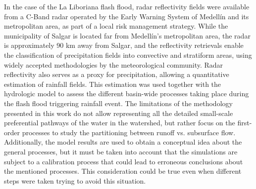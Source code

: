 \documentclass[hess, manuscript]{copernicus}
\begin{document}
In the case of the La Liboriana flash flood, radar reflectivity fields were available from a C-Band radar operated by the Early Warning System of Medellín and its metropolitan area, as part of a local risk management strategy. While the municipality of Salgar is located far from Medellín's metropolitan area, the radar is approximately 90 km away from Salgar, and the reflectivity retrievals enable the classification of precipitation fields into convective and stratiform areas, using widely accepted methodologies by the meteorological community.  Radar reflectivity also serves as a proxy for precipitation, allowing a quantitative estimation of rainfall fields. This estimation was used together with the hydrologic model to assess the different basin-wide processes taking place during the flash flood triggering rainfall event. The limitations of the methodology presented in this work do not allow representing all the detailed small-scale preferential pathways of the water in the watershed, but rather focus on the first-order processes to study the partitioning between runoff vs. subsurface flow. Additionally, the model results are used to obtain a conceptual idea about the general processes, but it must be taken into account that the simulations are subject to a calibration process that could lead to erroneous conclusions about the mentioned processes. This consideration could be true even when different steps were taken trying to avoid this situation.  \\
\end{document}

